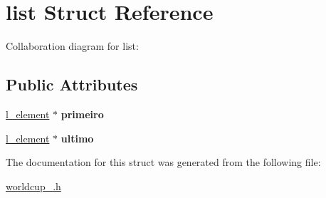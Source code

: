 \hypertarget{structlist}{}\section{list Struct Reference}
\label{structlist}


Collaboration diagram for list\+:
\subsection*{Public Attributes}
\begin{DoxyCompactItemize}
\item 
\hyperlink{structelement}{l\+\_\+element} $\ast$ {\bfseries primeiro}\hypertarget{structlist_a380d66169fbaa17dbeb2f8e47c7cad2b}{}\label{structlist_a380d66169fbaa17dbeb2f8e47c7cad2b}

\item 
\hyperlink{structelement}{l\+\_\+element} $\ast$ {\bfseries ultimo}\hypertarget{structlist_ab23365d7334d099f498daa551e05b32c}{}\label{structlist_ab23365d7334d099f498daa551e05b32c}

\end{DoxyCompactItemize}


The documentation for this struct was generated from the following file\+:\begin{DoxyCompactItemize}
\item 
\hyperlink{worldcup__2018_8h}{worldcup\+\_.\+h}\end{DoxyCompactItemize}
